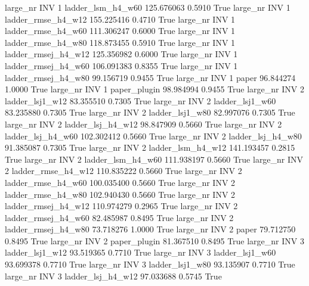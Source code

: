   large_nr      INV                 1   ladder_lsm_h4_w60  125.676063      0.5910    True
  large_nr      INV                 1  ladder_rmse_h4_w12  155.225416      0.4710    True
  large_nr      INV                 1  ladder_rmse_h4_w60  111.306247      0.6000    True
  large_nr      INV                 1  ladder_rmse_h4_w80  118.873455      0.5910    True
  large_nr      INV                 1 ladder_rmsej_h4_w12  125.356982      0.6000    True
  large_nr      INV                 1 ladder_rmsej_h4_w60  106.091383      0.8355    True
  large_nr      INV                 1 ladder_rmsej_h4_w80   99.156719      0.9455    True
  large_nr      INV                 1               paper   96.844274      1.0000    True
  large_nr      INV                 1        paper_plugin   98.984994      0.9455    True
  large_nr      INV                 2     ladder_lsj1_w12   83.355510      0.7305    True
  large_nr      INV                 2     ladder_lsj1_w60   83.235880      0.7305    True
  large_nr      INV                 2     ladder_lsj1_w80   82.997076      0.7305    True
  large_nr      INV                 2   ladder_lsj_h4_w12   98.847909      0.5660    True
  large_nr      INV                 2   ladder_lsj_h4_w60  102.302412      0.5660    True
  large_nr      INV                 2   ladder_lsj_h4_w80   91.385087      0.7305    True
  large_nr      INV                 2   ladder_lsm_h4_w12  141.193457      0.2815    True
  large_nr      INV                 2   ladder_lsm_h4_w60  111.938197      0.5660    True
  large_nr      INV                 2  ladder_rmse_h4_w12  110.835222      0.5660    True
  large_nr      INV                 2  ladder_rmse_h4_w60  100.035400      0.5660    True
  large_nr      INV                 2  ladder_rmse_h4_w80  102.940430      0.5660    True
  large_nr      INV                 2 ladder_rmsej_h4_w12  110.974279      0.2965    True
  large_nr      INV                 2 ladder_rmsej_h4_w60   82.485987      0.8495    True
  large_nr      INV                 2 ladder_rmsej_h4_w80   73.718276      1.0000    True
  large_nr      INV                 2               paper   79.712750      0.8495    True
  large_nr      INV                 2        paper_plugin   81.367510      0.8495    True
  large_nr      INV                 3     ladder_lsj1_w12   93.519365      0.7710    True
  large_nr      INV                 3     ladder_lsj1_w60   93.699378      0.7710    True
  large_nr      INV                 3     ladder_lsj1_w80   93.135907      0.7710    True
  large_nr      INV                 3   ladder_lsj_h4_w12   97.033688      0.5745    True
